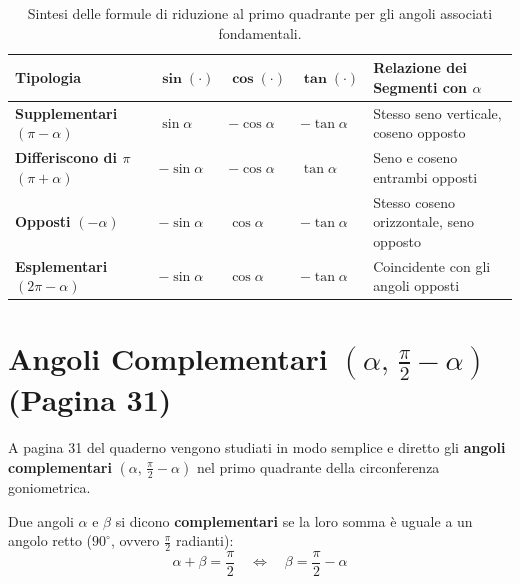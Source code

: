 \documentclass[11pt,a4paper,oneside]{report}
\begin{document}
\begin{table}[htbp]
\centering
\small
\caption{Sintesi delle formule di riduzione al primo quadrante per gli angoli associati fondamentali.}
\label{tab:angoli_associati_sintesi}
\begin{tabularx}{\textwidth}{>{\centering\arraybackslash}X >{\centering\arraybackslash}X >{\centering\arraybackslash}X >{\centering\arraybackslash}X >{\raggedright\arraybackslash}X}
\toprule
\textbf{Tipologia} & $\mathbf{\sin(\cdot)}$ & $\mathbf{\cos(\cdot)}$ & $\mathbf{\tan(\cdot)}$ & \textbf{Relazione dei Segmenti con $\alpha$} \\
\midrule
\textbf{Supplementari} $(\pi - \alpha)$ & $\sin\alpha$ & $-\cos\alpha$ & $-\tan\alpha$ & Stesso seno verticale, coseno opposto \\[1ex]
\textbf{Differiscono di $\pi$} $(\pi + \alpha)$ & $-\sin\alpha$ & $-\cos\alpha$ & $\tan\alpha$ & Seno e coseno entrambi opposti \\[1ex]
\textbf{Opposti} $(-\alpha)$ & $-\sin\alpha$ & $\cos\alpha$ & $-\tan\alpha$ & Stesso coseno orizzontale, seno opposto \\[1ex]
\textbf{Esplementari} $(2\pi - \alpha)$ & $-\sin\alpha$ & $\cos\alpha$ & $-\tan\alpha$ & Coincidente con gli angoli opposti \\
\bottomrule
\end{tabularx}
\end{table}


\section{Angoli Complementari $\left(\alpha, \, \frac{\pi}{2} - \alpha\right)$ (Pagina 31)}
A pagina 31 del quaderno vengono studiati in modo semplice e diretto gli \textbf{angoli complementari} $\left(\alpha, \, \frac{\pi}{2} - \alpha\right)$ nel primo quadrante della circonferenza goniometrica.

\begin{definizione}
Due angoli $\alpha$ e $\beta$ si dicono \textbf{complementari} se la loro somma è uguale a un angolo retto ($90^\circ$, ovvero $\frac{\pi}{2}$ radianti):
\begin{equation}
    \alpha + \beta = \frac{\pi}{2} \quad \iff \quad \beta = \frac{\pi}{2} - \alpha
\end{equation}
\end{definizione}
\end{document}

